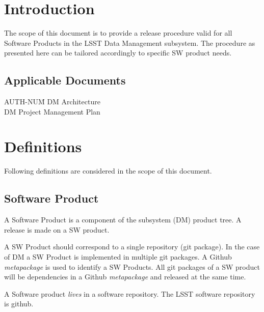 \section{Introduction} \label{sec:intro}

The scope of this document is to provide a release procedure valid for all Software Products in the LSST Data Management subsystem. The procedure as presented here can be tailored accordingly to specific SW product needs.

\subsection{Applicable Documents}

\begin{tabbing}
AUTH-NUM\= \kill
{} \>     DM Architecture\\
 \>     DM Project Management Plan   \\
\end{tabbing}


\newpage
\section{Definitions} \label{sec:definitions}

Following definitions are considered in the scope of this document.


\subsection{Software Product} \label{sect:swprod}

A Software Product is a component of the subsystem (DM) product tree.
A release is made on a SW product.

A SW Product should correspond to a single repository (git package).
In the case of DM a SW Product is implemented in multiple git packages.
A Github \textit{metapackage} is used to identify a SW Products.
All git packages of a SW product will be dependencies in a Github \textit{metapackage} and released at the same time.

A Software product \textit{lives} in a software repository. The LSST software repository is github.

